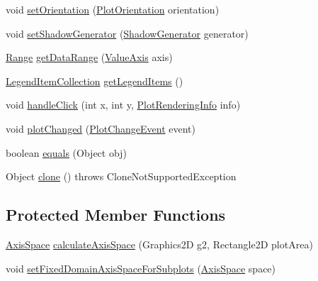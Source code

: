 \begin{DoxyCompactItemize}
\item 
void \mbox{\hyperlink{classorg_1_1jfree_1_1chart_1_1plot_1_1_combined_range_category_plot_a9e68e69228cf02549f519a5630f25ccb}{set\+Orientation}} (\mbox{\hyperlink{classorg_1_1jfree_1_1chart_1_1plot_1_1_plot_orientation}{Plot\+Orientation}} orientation)
\item 
void \mbox{\hyperlink{classorg_1_1jfree_1_1chart_1_1plot_1_1_combined_range_category_plot_aa517fa40f08864c0cba3b36a299b0c53}{set\+Shadow\+Generator}} (\mbox{\hyperlink{interfaceorg_1_1jfree_1_1chart_1_1util_1_1_shadow_generator}{Shadow\+Generator}} generator)
\item 
\mbox{\hyperlink{classorg_1_1jfree_1_1data_1_1_range}{Range}} \mbox{\hyperlink{classorg_1_1jfree_1_1chart_1_1plot_1_1_combined_range_category_plot_a1bf0007925eb1e5aab244a7a12a5ee13}{get\+Data\+Range}} (\mbox{\hyperlink{classorg_1_1jfree_1_1chart_1_1axis_1_1_value_axis}{Value\+Axis}} axis)
\item 
\mbox{\hyperlink{classorg_1_1jfree_1_1chart_1_1_legend_item_collection}{Legend\+Item\+Collection}} \mbox{\hyperlink{classorg_1_1jfree_1_1chart_1_1plot_1_1_combined_range_category_plot_a37a115625695a3f6781d7d57e9eb9ac2}{get\+Legend\+Items}} ()
\item 
void \mbox{\hyperlink{classorg_1_1jfree_1_1chart_1_1plot_1_1_combined_range_category_plot_a9560e9023513bb1e0ab9d6f302266ada}{handle\+Click}} (int x, int y, \mbox{\hyperlink{classorg_1_1jfree_1_1chart_1_1plot_1_1_plot_rendering_info}{Plot\+Rendering\+Info}} info)
\item 
void \mbox{\hyperlink{classorg_1_1jfree_1_1chart_1_1plot_1_1_combined_range_category_plot_a61fbbb220a4534bdad83eaf286f9d508}{plot\+Changed}} (\mbox{\hyperlink{classorg_1_1jfree_1_1chart_1_1event_1_1_plot_change_event}{Plot\+Change\+Event}} event)
\item 
boolean \mbox{\hyperlink{classorg_1_1jfree_1_1chart_1_1plot_1_1_combined_range_category_plot_a6afa22891ecb5eecf80a0f81fe36a1f9}{equals}} (Object obj)
\item 
Object \mbox{\hyperlink{classorg_1_1jfree_1_1chart_1_1plot_1_1_combined_range_category_plot_aefcf768f8caca0e448c307a5533a26cd}{clone}} ()  throws Clone\+Not\+Supported\+Exception 
\end{DoxyCompactItemize}
\subsection*{Protected Member Functions}
\begin{DoxyCompactItemize}
\item 
\mbox{\hyperlink{classorg_1_1jfree_1_1chart_1_1axis_1_1_axis_space}{Axis\+Space}} \mbox{\hyperlink{classorg_1_1jfree_1_1chart_1_1plot_1_1_combined_range_category_plot_a4bebbdd1ce0ddff401679c49bbb72b2b}{calculate\+Axis\+Space}} (Graphics2D g2, Rectangle2D plot\+Area)
\item 
void \mbox{\hyperlink{classorg_1_1jfree_1_1chart_1_1plot_1_1_combined_range_category_plot_a6916ffb761ec591261283a2af43a5d61}{set\+Fixed\+Domain\+Axis\+Space\+For\+Subplots}} (\mbox{\hyperlink{classorg_1_1jfree_1_1chart_1_1axis_1_1_axis_space}{Axis\+Space}} space)
\end{DoxyCompactItemize}
